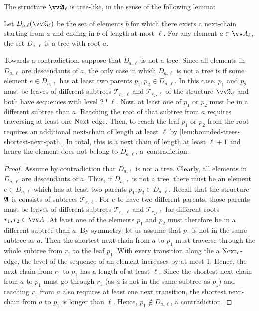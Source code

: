 \noindent
The structure $\unravel{A}_{\ell}$ is tree-like, in the sense of the following lemma:
\begin{lemma}\label{lem:companion-tree-like}
  Let $D_{a, \ell}(\unravel{A}_{\ell})$ be the set of elements $b$ for which there exists a next-chain starting from $a$ and ending in $b$ of length at most $\ell$.
  For any element $a \in \unraveldom{A}_{\ell}$, the set $D_{a, \ell}$ is a tree with root $a$.
\end{lemma}
\begin{proofsketch}
  Towards a contradiction, suppose that $D_{a,\ell}$ is not a tree. Since all elements in $D_{a,\ell}$ are descendants of $a$, the only case in which $D_{a,\ell}$ is not a tree is if some element $e \in D_{a,\ell}$ has at least two parents $p_{1}, p_{2} \in D_{a,\ell}$.
  In this case, $p_{1}$ and $p_{2}$ must be leaves of different subtrees $\mathcal{T}_{r_{1},\ell}$ and $\mathcal{T}_{r_{2},\ell}$ of the structure $\unravel{A}_{\ell}$ and both have sequences with level $2 * \ell$.
  Now, at least one of $p_{1}$ or $p_{2}$ must be in a different subtree than $a$.
  Reaching the root of that subtree from $a$ requires traversing at least one $\mathrm{Next}$-edge.
  Then, to reach the leaf $p_{1}$ or $p_{2}$ from the root requires an additional next-chain of length at least $\ell$ by \cref{lem:bounded-trees-shortest-next-path}.
  In total, this is a next chain of length at least $\ell + 1$ and hence the element does not belong to $D_{a,\ell}$, a~contradiction.
\end{proofsketch}
\begin{proof}
  Assume by contradiction that $D_{a,\ell}$ is not a tree.
  Clearly, all elements in $D_{a,\ell}$ are descendants of $a$.
  Thus, if $D_{a,\ell}$ is not a tree, there must be an element $e \in D_{a,\ell}$ which has at least two parents $p_{1}, p_{2} \in D_{a,\ell}$.
  Recall that the structure ${\mathfrak{A}}$ is consists of subtrees $\mathcal{T}_{r,\ell}$.
  For $e$ to have two different parents, those parents must be leaves of different subtrees $\mathcal{T}_{r_{1},\ell}$ and $\mathcal{T}_{r_{2}, \ell}$ for different roots $r_{1}, r_{2} \in \unraveldom{A}$.
  At least one of the elements $p_{1}$ and $p_{2}$ must therefore be in a different subtree than $a$.
  By symmetry, let us assume that $p_{1}$ is not in the same subtree as $a$.
  Then the shortest next-chain from $a$ to $p_{1}$ must traverse through the whole subtree from $r_{1}$ to the leaf $p_{1}$.
  With every transition along the a $\mathrm{Next}_{\ell}$-edge, the level of the sequence of an element increases by at most 1.
  Hence, the next-chain from $r_{1}$ to $p_{1}$ has a length of at least $\ell$.
  Since the shortest next-chain from $a$ to $p_{1}$ must go through $r_{1}$ (as $a$ is not in the same subtree as $p_{1}$) and reaching $r_{1}$ from $a$ also requires at least one next transition, the shortest next-chain from $a$ to $p_{1}$ is longer than $\ell$.
  Hence, $p_{1} \notin D_{a,\ell}$, a contradiction.
\end{proof}

